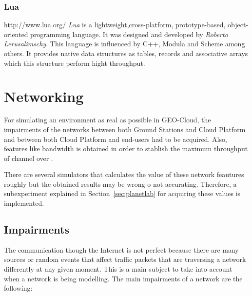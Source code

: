 \subsubsection{Lua}
http://www.lua.org/
\emph{Lua} is a lightweight,cross-platform, prototype-based, object-oriented programming
language. It was designed and developed by \emph{Roberto Lerusalimschy}. This
language is influenced by C++, Modula and Scheme among others. It provides
native data structures as tables, records and associative arrays which this
structure perform hight throughput.


\section{Networking}

For simulating an environment as real as possible in GEO-Cloud, the impairments  of the networks between both Ground Stations and Cloud Platform
and between both Cloud Platform and end-users had to be acquired. Also, features
like bandwidth is obtained in order to stablish the maximum throughput of
channel over \vw.

There are several simulators that
calculates the value of these network feautures roughly but the obtained results
may be wrong o not accurating. Therefore, a subexperiment explained in
Section~\ref{sec:planetlab} for acquiring these values is implemented. 

\subsection{Impairments}

The communication though the Internet is not perfect because there are many
sources or random events that affect traffic packets that are traversing a
network differently at any given moment. This is a main
subject to take into account when a network is being modelling. The main
impairments
 of a network are the following:

